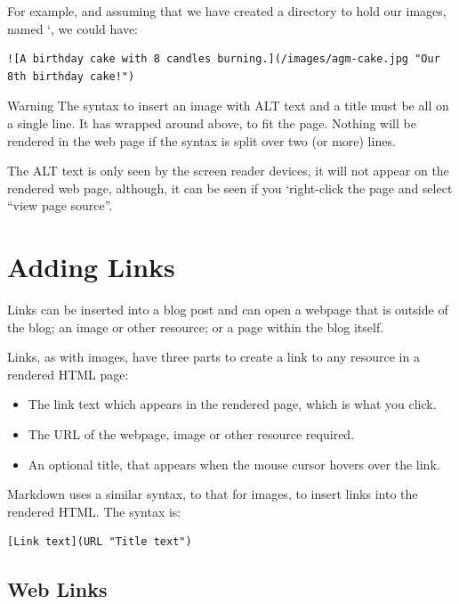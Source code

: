 For example, and assuming that we have created a directory to hold our images, named `, we could have:

\begin{lstlisting}[style=myText]
![A birthday cake with 8 candles burning.](/images/agm-cake.jpg "Our 8th birthday cake!")
\end{lstlisting}

\begin{tips}{Warning}
    The syntax to insert an image with ALT text and a title must be all on a single line. It has wrapped around above, to fit the page. Nothing will be rendered in the web page if the syntax is split over two (or more) lines.
\end{tips}

The ALT text is only seen by the screen reader devices, it will not appear on the rendered web page, although, it can be seen if you `right-click the page and select ``view page source''.

\section{Adding Links}\label{sect: Adding Links}

Links can be inserted into a blog post and can open a webpage that is outside of the blog; an image or other resource; or a page within the blog itself.

Links, as with images, have three parts to create a link to any resource in a rendered HTML page:

\begin{itemize}
    \item The link text which appears in the rendered page, which is what you click.
    \item The URL of the webpage, image or other resource required.
    \item An optional title, that appears when the mouse cursor hovers over the link.
\end{itemize}

Markdown uses a similar syntax, to that for images, to insert links into the rendered HTML. The syntax is:

\begin{lstlisting}[style=myText]
[Link text](URL "Title text")
\end{lstlisting}


\subsection{Web Links}\label{sect: Web Links}

